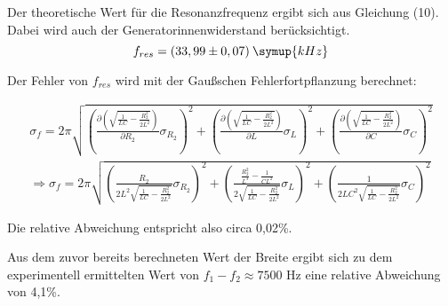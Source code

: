 Der theoretische Wert für die Resonanzfrequenz ergibt sich aus Gleichung (10).
Dabei wird auch der Generatorinnenwiderstand berücksichtigt.
\begin{equation*}
  f_{res} = (33,99 \pm 0,07) \:\symup{kHz}
\end{equation*}

Der Fehler von $f_{res}$ wird mit der Gaußschen Fehlerfortpflanzung berechnet:

\begin{align*}
  \sigma_f = 2\pi \sqrt{
  \left( \frac{\partial \left(\sqrt{\frac{1}{LC} - \frac{R_2^2}{2L^2}}\right)}{\partial R_2} \sigma_{R_2} \right)^{\!\! 2} +
  \left( \frac{\partial \left(\sqrt{\frac{1}{LC} - \frac{R_2^2}{2L^2}}\right)}{\partial L} \sigma_{L} \right)^{\!\! 2} +
  \left( \frac{\partial \left(\sqrt{\frac{1}{LC} - \frac{R_2^2}{2L^2}}\right)}{\partial C} \sigma_{C} \right)^{\!\! 2}
      } \\
    \Rightarrow  \sigma_f = 2 \pi \sqrt{\left(\frac{R_2}{2L^2 \sqrt{\frac{1}{LC} - \frac{R_2^2}{2L^2}}} \sigma_{R_2} \right)^2 +
  \left(\frac{\frac{R_2^2}{L^3}-\frac{1}{CL^2}}{2\sqrt{\frac{1}{LC} - \frac{R_2^2}{2L^2}}} \sigma_L \right)^2 +
  \left(\frac{1}{2LC^2  \sqrt{\frac{1}{LC} - \frac{R_2^2}{2L^2}}} \sigma_C \right)^2}
\end{align*}

Die relative Abweichung entspricht also circa 0,02\%.

Aus dem zuvor bereits berechneten Wert der Breite ergibt sich zu dem experimentell
ermittelten Wert von $f_1 - f_2 \approx 7500$ Hz eine relative Abweichung von 4,1\%.




